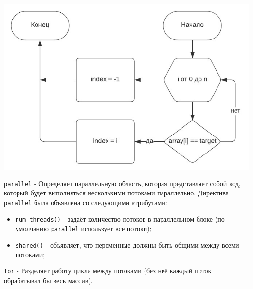 \begin{center}
    \includegraphics[scale=1.4]{images/block_diagram.jpeg}
\end{center}

\newpage


\verb|parallel| - Определяет параллельную область, которая представляет собой код, который будет выполняться несколькими потоками параллельно. Директива \verb|parallel| была объявлена со следующими атрибутами:

\vspace{1mm}
\begin{itemize}
\setlength{\itemsep}{10pt}
    \item \verb|num_threads()| - задаёт количество потоков в параллельном блоке (по умолчанию \verb|parallel| использует все потоки);
    \item \verb|shared()| - объявляет, что переменные должны быть общими между всеми потоками;
\end{itemize}
\vspace{3mm}

\verb|for| - Разделяет работу цикла между потоками (без неё каждый поток обрабатывал бы весь массив).\\

